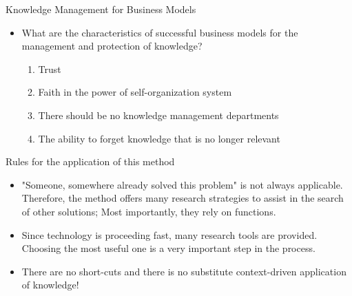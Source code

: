 \documentclass{beamer}
\begin{document}
		\begin{frame}{Knowledge Management for Business Models}
		\begin{itemize}
		    \item What are the characteristics of successful business models for the management and protection of knowledge?
		    \begin{enumerate}
		        \item Trust
		        \item Faith in the power of self-organization system
		        \item There should be no knowledge management departments
		        \item The ability to forget knowledge that is no longer relevant
		    \end{enumerate}
		    
		\end{itemize}
	\end{frame}
	
		\begin{frame}{Rules for the application of this method}
		\begin{itemize}
		    \item "Someone, somewhere already solved this problem" is not always applicable. Therefore, the method offers many research strategies to assist in the search of other solutions; Most importantly, they rely on functions.
		    \item Since technology is proceeding fast, many research tools are provided. Choosing the most useful one is a very important step in the process.
		    \item There are no short-cuts and there is no substitute context-driven application of knowledge!
		\end{itemize}
	\end{frame}
	
\end{document}
